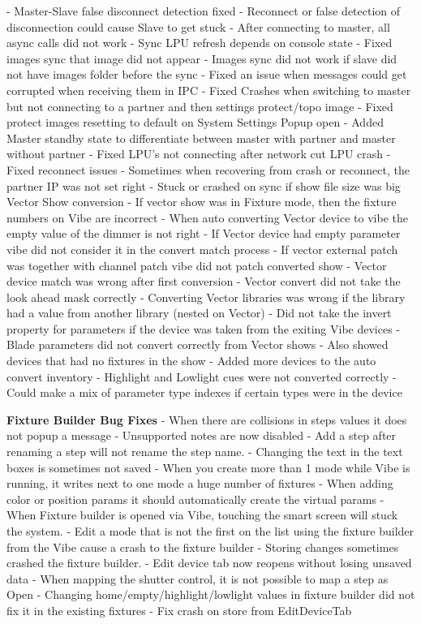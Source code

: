 \documentclass[
]{article}
\begin{document}
- Master-Slave false disconnect detection fixed
- Reconnect or false detection of disconnection could cause Slave to get stuck
- After connecting to master, all async calls did not work
- Sync LPU refresh depends on console state
- Fixed images sync that image did not appear
- Images sync did not work if slave did not have images folder before the sync
- Fixed an issue when messages could get corrupted when receiving them in IPC
- Fixed Crashes when switching to master but not connecting to a partner and then settings protect/topo image
- Fixed protect images resetting to default on System Settings Popup open
- Added Master standby state to differentiate between master with partner and master without partner
- Fixed LPU's not connecting after network cut LPU crash
- Fixed reconnect issues
- Sometimes when recovering from crash or reconnect, the partner IP was not set right
- Stuck or crashed on sync if show file size was big
Vector Show conversion
- If vector show was in Fixture mode, then the fixture numbers on Vibe are incorrect
- When auto converting Vector device to vibe the empty value of the dimmer is not right
- If Vector device had empty parameter vibe did not consider it in the convert match process
- If vector external patch was together with channel patch vibe did not patch converted show
- Vector device match was wrong after first conversion
- Vector convert did not take the look ahead mask correctly
- Converting Vector libraries was wrong if the library had a value from another library (nested on Vector)
- Did not take the invert property for parameters if the device was taken from the exiting Vibe devices
- Blade parameters did not convert correctly from Vector shows
- Also showed devices that had no fixtures in the show
- Added more devices to the auto convert inventory
- Highlight and Lowlight cues were not converted correctly
- Could make a mix of parameter type indexes if certain types were in the device

\textbf{Fixture Builder Bug Fixes}
- When there are collisions in steps values it does not popup a message
- Unsupported notes are now disabled
- Add a step after renaming a step will not rename the step name.
- Changing the text in the text boxes is sometimes not saved
- When you create more than 1 mode while Vibe is running, it writes next to one mode a huge number of fixtures
- When adding color or position params it should automatically create the virtual params
- When Fixture builder is opened via Vibe, touching the smart screen will stuck the system.
- Edit a mode that is not the first on the list using the fixture builder from the Vibe cause a crash to the fixture builder
- Storing changes sometimes crashed the fixture builder.
- Edit device tab now reopens without losing unsaved data
- When mapping the shutter control, it is not possible to map a step as Open
- Changing home/empty/highlight/lowlight values in fixture builder did not fix it in the existing fixtures
- Fix crash on store from EditDeviceTab
\end{document}
